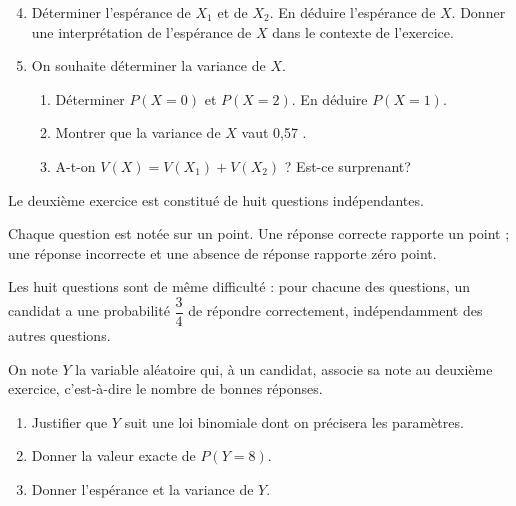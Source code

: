 \begin{enumerate}
\setcounter{enumi}{3}
\item Déterminer l'espérance de $X_{1}$ et de $X_{2}$. En déduire l'espérance de $X$. Donner une interprétation de l'espérance de $X$ dans le contexte de l'exercice.

\item On souhaite déterminer la variance de $X$.

	\begin{enumerate}
		\item Déterminer $P(X = 0)$ et $P(X = 2)$. En déduire $P(X = 1)$.

		\item Montrer que la variance de $X$ vaut 0,57 .

		\item A-t-on $V(X) = V\left(X_{1}\right) + V\left(X_{2}\right)$ ? Est-ce surprenant?
	\end{enumerate}
\end{enumerate}


\medskip


\medskip

Le deuxième exercice est constitué de huit questions indépendantes.

Chaque question est notée sur un point. Une réponse correcte rapporte un point ; une réponse incorrecte et une absence de réponse rapporte zéro point.

Les huit questions sont de même difficulté : pour chacune des questions, un candidat a une probabilité $\dfrac{3}{4}$ de répondre correctement, indépendamment des autres questions.

On note $Y$ la variable aléatoire qui, à un candidat, associe sa note au deuxième exercice, c'est-à-dire le nombre de bonnes réponses.

\begin{enumerate}
\item Justifier que $Y$ suit une loi binomiale dont on précisera les paramètres.

\item Donner la valeur exacte de $P(Y = 8)$.

\item Donner l'espérance et la variance de $Y$.

\end{enumerate}


\medskip


